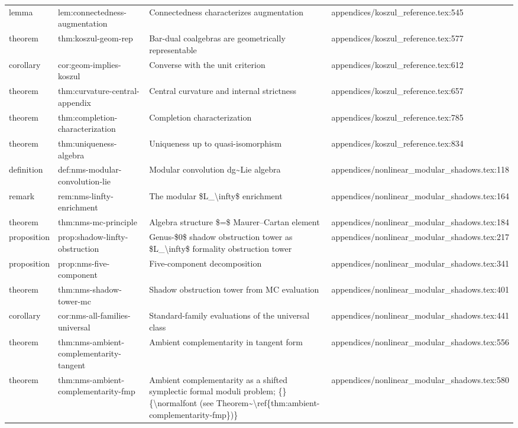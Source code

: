 \documentclass[11pt]{article}
\begin{document}
\begin{longtable}{L{0.10\textwidth}L{0.26\textwidth}L{0.42\textwidth}L{0.22\textwidth}}
lemma & lem:connectedness-augmentation & Connectedness characterizes augmentation & appendices/koszul\_reference.tex:545\\
theorem & thm:koszul-geom-rep & Bar-dual coalgebras are geometrically representable & appendices/koszul\_reference.tex:577\\
corollary & cor:geom-implies-koszul & Converse with the unit criterion & appendices/koszul\_reference.tex:612\\
theorem & thm:curvature-central-appendix & Central curvature and internal strictness & appendices/koszul\_reference.tex:657\\
theorem & thm:completion-characterization & Completion characterization & appendices/koszul\_reference.tex:785\\
theorem & thm:uniqueness-algebra & Uniqueness up to quasi-isomorphism & appendices/koszul\_reference.tex:834\\
definition & def:nms-modular-convolution-lie & Modular convolution dg\textasciitilde{}Lie algebra & appendices/nonlinear\_modular\_shadows.tex:118\\
remark & rem:nms-linfty-enrichment & The modular \$L\_\textbackslash{}infty\$ enrichment & appendices/nonlinear\_modular\_shadows.tex:164\\
theorem & thm:nms-mc-principle & Algebra structure \$=\$ Maurer--Cartan element & appendices/nonlinear\_modular\_shadows.tex:184\\
proposition & prop:shadow-linfty-obstruction & Genus-\$0\$ shadow obstruction tower as \$L\_\textbackslash{}infty\$ formality obstruction tower & appendices/nonlinear\_modular\_shadows.tex:217\\
proposition & prop:nms-five-component & Five-component decomposition & appendices/nonlinear\_modular\_shadows.tex:341\\
theorem & thm:nms-shadow-tower-mc & Shadow obstruction tower from MC evaluation & appendices/nonlinear\_modular\_shadows.tex:401\\
corollary & cor:nms-all-families-universal & Standard-family evaluations of the universal class & appendices/nonlinear\_modular\_shadows.tex:441\\
theorem & thm:nms-ambient-complementarity-tangent & Ambient complementarity in tangent form & appendices/nonlinear\_modular\_shadows.tex:556\\
theorem & thm:nms-ambient-complementarity-fmp & Ambient complementarity as a shifted symplectic formal moduli problem; \{\} \{\textbackslash{}normalfont (see Theorem\textasciitilde{}\textbackslash{}ref\{thm:ambient-complementarity-fmp\})\} & appendices/nonlinear\_modular\_shadows.tex:580\\

\end{longtable}
\end{document}
